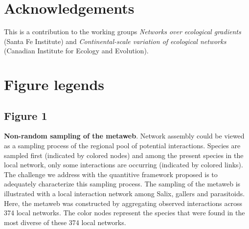 \documentclass[12pt]{article}
\begin{document}
\newpage






\section*{Acknowledgements}
This is a contribution to the working groups \emph{Networks over ecological
gradients} (Santa Fe Institute) and \emph{Continental-scale variation of
ecological networks} (Canadian Institute for Ecology and Evolution). 
\newpage


\newpage
\section*{Figure legends}

\subsection*{Figure 1}
\textbf{Non-random sampling of the metaweb}. 
Network assembly could be viewed as a sampling process of the regional pool of
potential interactions. Species are sampled first (indicated by colored nodes)
and among the present species in the local network, only some interactions are
occurring (indicated by colored links). The challenge we address with the
quantitive framework proposed is to adequately characterize this sampling
process. The sampling of the metaweb is illustrated with a local interaction
network among Salix, gallers and parasitoids. Here, the metaweb was
constructed by aggregating observed interactions across 374 local networks.
The color nodes represent the species that were found in the most diverse of
these 374 local networks.

\end{document}
